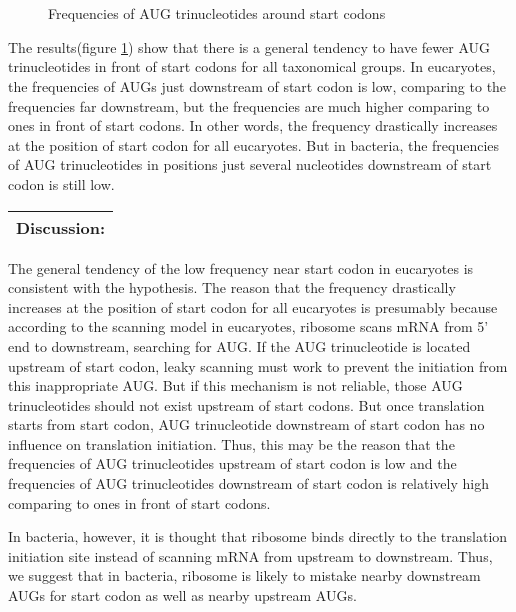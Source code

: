 \begin{figure}
\\
\\
\caption{Frequencies of AUG trinucleotides around start codons}
\label{atg_freq}
\end{figure}

The results(figure \ref{atg_freq}) show that there is a general
tendency to have fewer  
AUG trinucleotides in front of start codons for all taxonomical
groups.
In eucaryotes, the frequencies of AUGs just downstream of start codon is low,
comparing to the frequencies far downstream, but the frequencies are
much higher comparing to ones in front of start codons.
In other words, the frequency drastically increases at the position
 of start codon for
all eucaryotes. But in bacteria, the frequencies of AUG trinucleotides
in positions just several nucleotides downstream of start codon is still low.

\vspace{2ex}
\noindent
\begin{tabular}{|l|}
\hline
Discussion:\\
\hline
\end{tabular}

The general tendency of the low frequency near start
codon in eucaryotes is consistent
with the hypothesis. The reason that the frequency drastically
increases at the position of start codon for all eucaryotes is
presumably
because according to the scanning model in eucaryotes,
ribosome scans mRNA from 5' end to downstream, searching for AUG.
If the AUG trinucleotide is located upstream of start codon, 
leaky scanning must work to prevent the initiation from this
inappropriate AUG. But if this mechanism is not reliable, 
those AUG trinucleotides should not exist upstream of start codons.  
But once translation starts
from start codon, AUG trinucleotide downstream of start codon has no 
influence on translation initiation.
Thus, this may be the reason that the frequencies of AUG
trinucleotides upstream of start codon is low and the frequencies
 of AUG trinucleotides downstream of start codon
is relatively high comparing to ones in front of start codons.

In bacteria, however, it is thought that ribosome binds directly to 
the translation initiation site instead of scanning mRNA from upstream
to downstream. Thus, we suggest that in bacteria, 
ribosome is likely to mistake nearby downstream AUGs for start codon
as well as nearby upstream AUGs.
